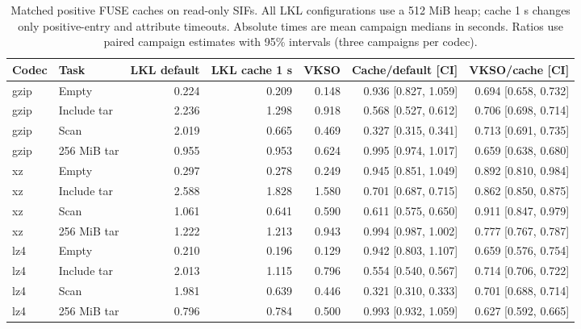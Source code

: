 \begin{table}[t]\centering\small
\caption{Matched positive FUSE caches on read-only SIFs. All LKL configurations use a 512 MiB heap; cache 1 s changes only positive-entry and attribute timeouts. Absolute times are mean campaign medians in seconds. Ratios use paired campaign estimates with 95\% intervals (three campaigns per codec).}
\label{tab:filesystem-cache}
\begin{tabular}{@{}llrrrrr@{}}\toprule
Codec & Task & LKL default & LKL cache 1 s & VKSO & Cache/default [CI] & VKSO/cache [CI] \\\midrule
gzip & Empty & 0.224 & 0.209 & 0.148 & 0.936 [0.827, 1.059] & 0.694 [0.658, 0.732] \\
gzip & Include tar & 2.236 & 1.298 & 0.918 & 0.568 [0.527, 0.612] & 0.706 [0.698, 0.714] \\
gzip & Scan & 2.019 & 0.665 & 0.469 & 0.327 [0.315, 0.341] & 0.713 [0.691, 0.735] \\
gzip & 256 MiB tar & 0.955 & 0.953 & 0.624 & 0.995 [0.974, 1.017] & 0.659 [0.638, 0.680] \\
xz & Empty & 0.297 & 0.278 & 0.249 & 0.945 [0.851, 1.049] & 0.892 [0.810, 0.984] \\
xz & Include tar & 2.588 & 1.828 & 1.580 & 0.701 [0.687, 0.715] & 0.862 [0.850, 0.875] \\
xz & Scan & 1.061 & 0.641 & 0.590 & 0.611 [0.575, 0.650] & 0.911 [0.847, 0.979] \\
xz & 256 MiB tar & 1.222 & 1.213 & 0.943 & 0.994 [0.987, 1.002] & 0.777 [0.767, 0.787] \\
lz4 & Empty & 0.210 & 0.196 & 0.129 & 0.942 [0.803, 1.107] & 0.659 [0.576, 0.754] \\
lz4 & Include tar & 2.013 & 1.115 & 0.796 & 0.554 [0.540, 0.567] & 0.714 [0.706, 0.722] \\
lz4 & Scan & 1.981 & 0.639 & 0.446 & 0.321 [0.310, 0.333] & 0.701 [0.688, 0.714] \\
lz4 & 256 MiB tar & 0.796 & 0.784 & 0.500 & 0.993 [0.932, 1.059] & 0.627 [0.592, 0.665] \\
\bottomrule\end{tabular}\end{table}
